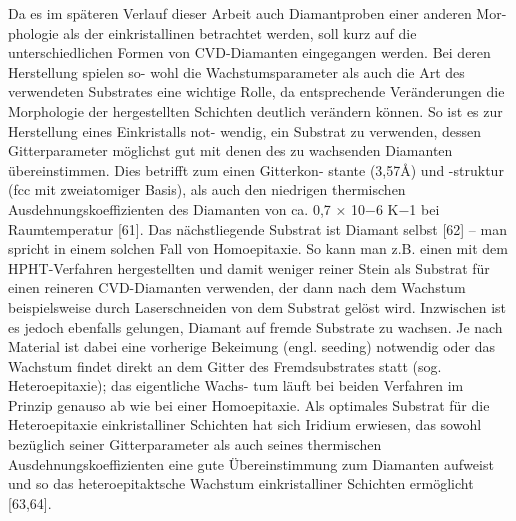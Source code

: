       Da es im späteren Verlauf dieser Arbeit auch Diamantproben einer anderen Mor- phologie als der einkristallinen betrachtet werden, soll kurz auf die unterschiedlichen Formen von CVD-Diamanten eingegangen werden. Bei deren Herstellung spielen so- wohl die Wachstumsparameter als auch die Art des verwendeten Substrates eine wichtige Rolle, da entsprechende Veränderungen die Morphologie der hergestellten Schichten deutlich verändern können. So ist es zur Herstellung eines Einkristalls not- wendig, ein Substrat zu verwenden, dessen Gitterparameter möglichst gut mit denen des zu wachsenden Diamanten übereinstimmen. Dies betrifft zum einen Gitterkon- stante (3,57Å) und -struktur (fcc mit zweiatomiger Basis), als auch den niedrigen thermischen Ausdehnungskoeffizienten des Diamanten von ca. 0,7 × 10−6 K−1 bei Raumtemperatur [61]. Das nächstliegende Substrat ist Diamant selbst [62] – man spricht in einem solchen Fall von Homoepitaxie. So kann man z.B. einen mit dem HPHT-Verfahren hergestellten und damit weniger reiner Stein als Substrat für einen reineren CVD-Diamanten verwenden, der dann nach dem Wachstum beispielsweise durch Laserschneiden von dem Substrat gelöst wird. Inzwischen ist es jedoch ebenfalls gelungen, Diamant auf fremde Substrate zu wachsen. Je nach Material ist dabei eine vorherige Bekeimung (engl. seeding) notwendig oder das Wachstum findet direkt an dem Gitter des Fremdsubstrates statt (sog. Heteroepitaxie); das eigentliche Wachs- tum läuft bei beiden Verfahren im Prinzip genauso ab wie bei einer Homoepitaxie. Als optimales Substrat für die Heteroepitaxie einkristalliner Schichten hat sich Iridium erwiesen, das sowohl bezüglich seiner Gitterparameter als auch seines thermischen Ausdehnungskoeffizienten eine gute Übereinstimmung zum Diamanten aufweist und so das heteroepitaktsche Wachstum einkristalliner Schichten ermöglicht [63,64].

